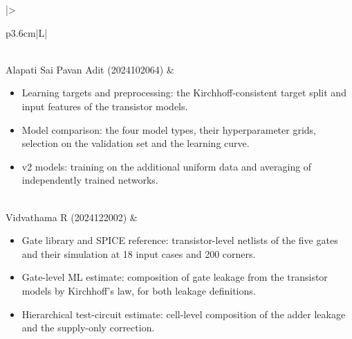 \documentclass[12pt, a4paper]{article}
\begin{document}
\begin{table}[H]
\begin{tabularx}{\linewidth}{|>{\raggedright\arraybackslash}p{3.6cm}|L|}
\begin{itemize}[leftmargin=*, nosep, topsep=0pt]
\end{itemize}
\vspace{-0.9em} \\
\hline
Alapati Sai Pavan Adit (2024102064) &
\vspace{-0.9em}
\begin{itemize}[leftmargin=*, nosep, topsep=0pt]
    \item Learning targets and preprocessing: the Kirchhoff-consistent target split and input features of the transistor models.
    \item Model comparison: the four model types, their hyperparameter grids, selection on the validation set and the learning curve.
    \item v2 models: training on the additional uniform data and averaging of independently trained networks.
\end{itemize}
\vspace{-0.9em} \\
\hline
Vidvathama R (2024122002) &
\vspace{-0.9em}
\begin{itemize}[leftmargin=*, nosep, topsep=0pt]
    \item Gate library and SPICE reference: transistor-level netlists of the five gates and their simulation at 18 input cases and 200 corners.
    \item Gate-level ML estimate: composition of gate leakage from the transistor models by Kirchhoff's law, for both leakage definitions.
    \item Hierarchical test-circuit estimate: cell-level composition of the adder leakage and the supply-only correction.
\end{itemize}
\vspace{-0.9em} \\
\hline
\end{tabularx}
\caption{Contributions of the team members.}
\label{tab:contrib}
\end{table}
\end{document}
